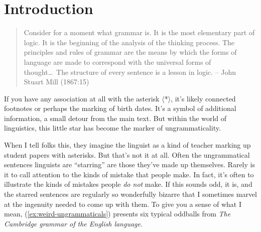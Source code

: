 \chapter{Introduction}





\begin{quote}
    Consider for a moment what grammar is. It is the most elementary part of logic. It is the beginning of the analysis of the thinking process. The principles and rules of grammar are the means by which the forms of language are made to correspond with the universal forms of thought\dots~The structure of every sentence is a lesson in logic. \hfill -- John Stuart Mill (1867:15)
\end{quote}

If you have any association at all with the asterisk $\langle$*$\rangle$, it's likely connected footnotes or perhaps the marking of birth dates. It's a symbol of additional information, a small detour from the main text. But within the world of linguistics, this little star has become the marker of ungrammaticality.

When I tell folks this, they imagine the linguist as a kind of teacher marking up student papers with asterisks. But that's not it at all. Often the ungrammatical sentences linguists are ``starring'' are those they've made up themselves. Rarely is it to call attention to the kinds of mistake that people make. In fact, it's often to illustrate the kinds of mistakes people \textit{do not} make. If this sounds odd, it is, and the starred sentences are regularly so wonderfully bizarre that I sometimes marvel at the ingenuity needed to come up with them. To give you a sense of what I mean, (\ref{ex:weird-ungrammaticals}) presents six typical oddballs from \textit{The Cambridge grammar of the English language}.

\ea \label{ex:weird-ungrammaticals}
    \z
\z

